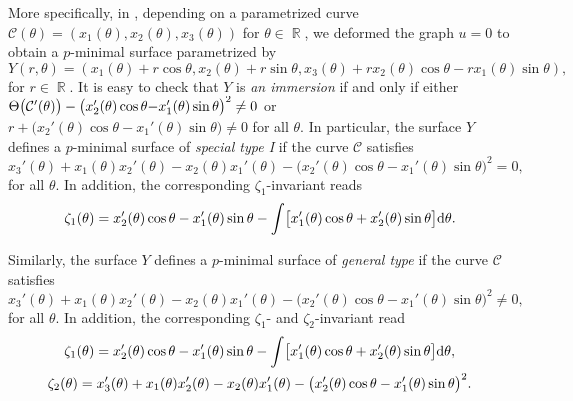 \documentclass[10pt,a4paper]{amsart}
\numberwithin{equation}{section}
\DeclareMathOperator{\R}{\mathbb R}
\begin{document}
More specifically, in \cite[Section 9]{ChiuH/LiuH:2022}, depending on a parametrized curve $\mathcal{C}(\theta)=(x_{1}(\theta), x_{2}(\theta), x_{3}(\theta))$ for $\theta\in\R$, we deformed the graph $u=0$ to obtain a $p$-minimal surface parametrized by
 \begin{equation*}%
 Y(r,\theta)=(x_{1}(\theta)+r\cos{\theta},x_{2}(\theta)+r\sin{\theta},x_{3}(\theta)+rx_{2}(\theta)\cos{\theta}-rx_{1}(\theta)\sin{\theta}),
 \end{equation*}
for $r\in\R$. It is easy to check that $Y$ is \emph{an immersion} if and only if either $\Theta\bigl(\mathcal{C}'(\theta)\bigr)-\bigl(x_{2}'(\theta)\cos{\theta}\smash{-x_{1}'(\theta)\sin{\theta}\bigr)^{2}\neq 0}$ or $r+\bigl(x_{2}'(\theta)\cos{\theta}-x_{1}'(\theta)\sin{\theta}\bigr)\neq 0$ for all $\theta$.
In particular, the surface $Y$ defines a $p$-minimal surface of \emph{special type I} if the curve $\mathcal{C}$ satisfies
\begin{equation*}%
x_{3}'(\theta)+x_{1}(\theta)x_{2}'(\theta)-x_{2}(\theta)x_{1}'(\theta)-\bigl(x_{2}'(\theta)\cos{\theta}-x_{1}'(\theta)\sin{\theta}\bigr)^2=0,
\end{equation*}
for all $\theta$.
In addition, the corresponding $\zeta_{1}$-invariant \cite[formula~(9.9)]{ChiuH/LiuH:2022} reads
\begin{equation}\label{713i}
\zeta_{1}(\theta)=x_{2}'(\theta)\cos{\theta}-x_{1}'(\theta)\sin{\theta}-\int \bigl[x_{1}'(\theta)\cos{\theta}+x_{2}'(\theta)\sin{\theta}\bigr]{\rm d}\theta.
\end{equation}

Similarly, the surface $Y$ defines a $p$-minimal surface of \emph{general type} if the curve $\mathcal{C}$ satisfies
\begin{equation*}%
x_{3}'(\theta)+x_{1}(\theta)x_{2}'(\theta)-x_{2}(\theta)x_{1}'(\theta)-\bigl(x_{2}'(\theta)\cos{\theta}-x_{1}'(\theta)\sin{\theta}\bigr)^2\neq 0,
\end{equation*}
for all $\theta$. In addition, the corresponding $\zeta_{1}$- and $\zeta_{2}$-invariant read
\begin{gather}
\zeta_{1}(\theta)=x_{2}'(\theta)\cos{\theta}-x_{1}'(\theta)\sin{\theta}-\int \bigl[x_{1}'(\theta)\cos{\theta}+x_{2}'(\theta)\sin{\theta}\bigr] {\rm d}\theta,\nonumber\\
\zeta_{2}(\theta)=x_{3}'(\theta)+x_{1}(\theta)x_{2}'(\theta)-x_{2}(\theta)x_{1}'(\theta)-\bigl(x_{2}'(\theta)\cos{\theta}-x_{1}'(\theta)\sin{\theta}\bigr)^2\label{714i}
.
\end{gather}
\end{document}
